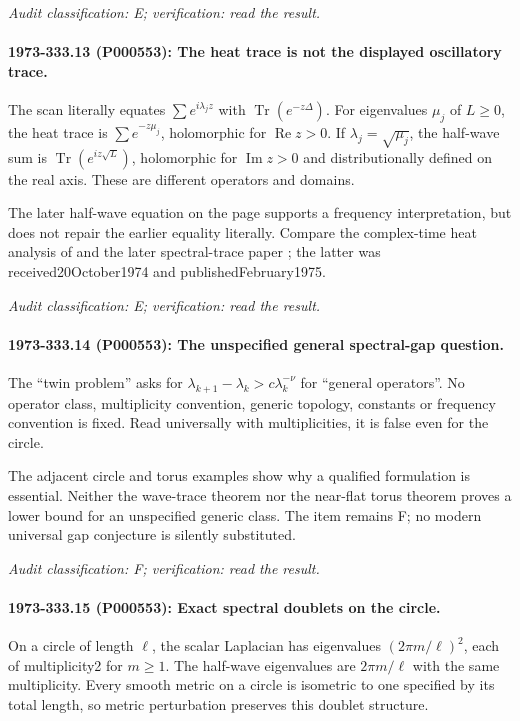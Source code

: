 \emph{Audit classification: E; verification: read the result.}

\paragraph{1973-333.13 (P000553): The heat trace is not the displayed oscillatory trace.}
The scan literally equates \(\sum e^{i\lambda_jz}\) with \(\operatorname{Tr}(e^{-z\Delta})\). For eigenvalues \(\mu_j\) of \(L\ge0\), the heat trace is \(\sum e^{-z\mu_j}\), holomorphic for \(\operatorname{Re}z>0\). If \(\lambda_j=\sqrt{\mu_j}\), the half-wave sum is \(\operatorname{Tr}(e^{iz\sqrt L})\), holomorphic for \(\operatorname{Im}z>0\) and distributionally defined on the real axis. These are different operators and domains.

The later half-wave equation on the page supports a frequency interpretation, but does not repair the earlier equality literally. Compare the complex-time heat analysis of \citet{colindeverdiere1973geodesicsii} and the later spectral-trace paper \citet{duistermaatguillemin1975spectrum}; the latter was received20October1974 and publishedFebruary1975.

\emph{Audit classification: E; verification: read the result.}

\paragraph{1973-333.14 (P000553): The unspecified general spectral-gap question.}
The “twin problem” asks for \(\lambda_{k+1}-\lambda_k>c\lambda_k^{-\nu}\) for “general operators”. No operator class, multiplicity convention, generic topology, constants or frequency convention is fixed. Read universally with multiplicities, it is false even for the circle.

The adjacent circle and torus examples show why a qualified formulation is essential. Neither the wave-trace theorem nor the near-flat torus theorem proves a lower bound for an unspecified generic class. The item remains F; no modern universal gap conjecture is silently substituted.

\emph{Audit classification: F; verification: read the result.}

\paragraph{1973-333.15 (P000553): Exact spectral doublets on the circle.}
On a circle of length \(\ell\), the scalar Laplacian has eigenvalues \((2\pi m/\ell)^2\), each of multiplicity2 for \(m\ge1\). The half-wave eigenvalues are \(2\pi m/\ell\) with the same multiplicity. Every smooth metric on a circle is isometric to one specified by its total length, so metric perturbation preserves this doublet structure.

